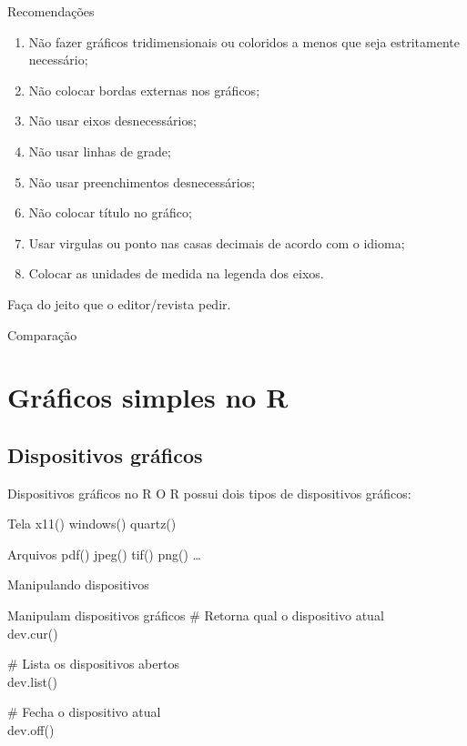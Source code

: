 \documentclass{beamer}
\begin{document}
\begin{frame}{Recomendações}

  \begin{enumerate}[<+->]
  \item Não fazer gráficos tridimensionais ou coloridos a menos que seja estritamente necessário;
  \item Não colocar bordas externas nos gráficos;
  \item Não usar eixos desnecessários;
  \item Não usar linhas de grade;
  \item Não usar preenchimentos desnecessários;
  \item Não colocar título no gráfico;
  \item Usar virgulas ou  ponto nas casas decimais de acordo com o idioma;
  \item Colocar as unidades de medida na legenda dos eixos.
  \end{enumerate}
  \pause
Faça do jeito que o editor/revista pedir.
\end{frame}

\begin{frame}{Comparação}
\centering
{}
  
\end{frame}
\section{Gráficos simples no R}
\subsection{Dispositivos gráficos}

\begin{frame}{Dispositivos gráficos no R}
O R possui dois tipos de dispositivos gráficos:

\begin{block}{Tela}
x11() windows() quartz()  
\end{block}
  
\begin{block}{Arquivos}
pdf() jpeg() tif() png() \ldots
\end{block}
\end{frame}

\begin{frame}{Manipulando dispositivos}

  \begin{block}{Manipulam dispositivos gráficos}
\# Retorna qual o dispositivo atual\\
dev.cur() \\ \vspace{10pt}

\# Lista os dispositivos abertos \\
dev.list() \\ \vspace{10pt}

\# Fecha o dispositivo atual\\
dev.off() \\ \vspace{10pt}   
  \end{block}
\end{frame}
\end{document}
